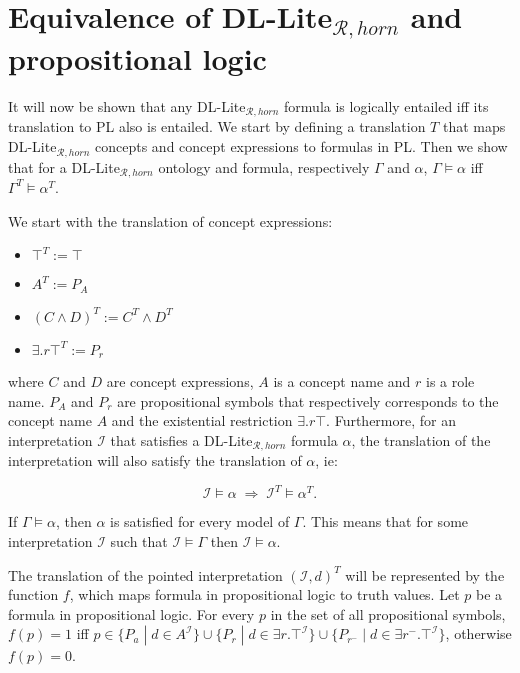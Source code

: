 \chapter{Equivalence of DL-Lite$_{\mathcal{R}, horn}$ and propositional logic}

\newtheorem{lemma}{Lemma}

It will now be shown that any DL-Lite$_{\mathcal{R}, horn}$ formula is logically entailed iff its translation to PL also is entailed. We start by defining a translation $T$ that maps DL-Lite$_{\mathcal{R}, horn}$ concepts and concept expressions to formulas in PL. Then we show that for a DL-Lite$_{\mathcal{R}, horn}$ ontology and formula, respectively $\Gamma$ and $\alpha$, $\Gamma \models \alpha$ iff $\Gamma^T \models \alpha^T$.

We start with the translation of concept expressions:
\begin{itemize}
    \item $\top^T := \top$
    \item $A^T := P_A$
    \item $(C \wedge D)^T := C^T \wedge D^T$
    \item ${\exists .r\top}^T := P_r$
\end{itemize}
 where $C$ and $D$ are concept expressions, $A$ is a concept name and $r$ is a role name. $P_A$ and $P_r$ are propositional symbols that respectively corresponds to the concept name $A$ and the existential restriction $\exists .r\top$. Furthermore, for an interpretation $\mathcal{I}$ that satisfies a DL-Lite$_{\mathcal{R}, horn}$ formula $\alpha$, the translation of the interpretation will also satisfy the translation of $\alpha$, ie:
 
 \[\mathcal{I} \models \alpha \; \Rightarrow \;  \mathcal{I}^T \models \alpha^T.\]
 
If $\Gamma \models \alpha$, then $\alpha$ is satisfied for every model of $\Gamma$. This means that for some interpretation $\mathcal{I}$ such that $\mathcal{I} \models \Gamma$ then $\mathcal{I} \models \alpha$.

The translation of the pointed interpretation $(\mathcal{I}, d)^T$ will be represented by the function $f$, which maps formula in propositional logic to truth values. Let $p$ be a formula in propositional logic. For every $p$ in the set of all propositional symbols, $f(p)=1$ iff $p\in \{P_a \; | \; d\in A^{\mathcal{I}}\}\cup\{P_r \; | \; d\in {\exists r.\top}^{\mathcal{I}}\}\cup \{P_{r^-} \; | \; d \in {\exists r^{-}.\top}^{\mathcal{I}}\}$, otherwise $f(p)=0$.
 
